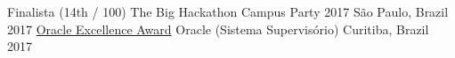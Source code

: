 



\begin{cvhonors}

  \cvhonor
    {Finalista (14th / 100) } %
    {The Big Hackathon Campus Party 2017} %
    {São Paulo, Brazil} %
    {2017} %
  \cvhonor
    {\href{https://www.linkedin.com/feed/update/activity:6329738492943310848}{Oracle Excellence Award}} %
    {Oracle (Sistema Supervisório)}%
    {Curitiba, Brazil} %
    {2017} %
\end{cvhonors}
